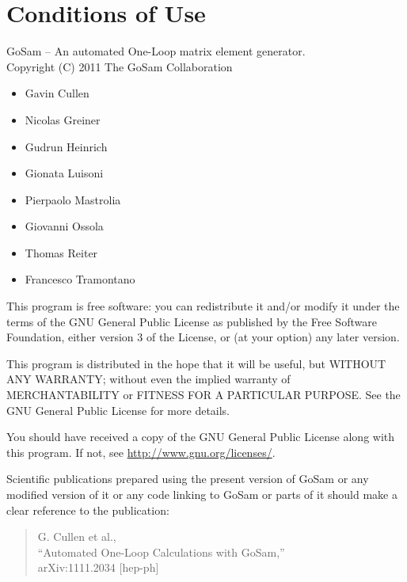 \documentclass[11pt,a4paper]{refrep}
\begin{document}
\begin{fullpage}

%
\end{fullpage}

\chapter*{Conditions of Use}
    GoSam -- An automated One-Loop matrix element generator.\\
    Copyright (C) 2011  The GoSam Collaboration\\
    \begin{itemize}               
                \item Gavin Cullen
                \item Nicolas Greiner
                \item Gudrun Heinrich
                \item Gionata Luisoni
                \item Pierpaolo Mastrolia
                \item Giovanni Ossola
                \item Thomas Reiter
                \item Francesco Tramontano
    \end{itemize}

    This program is free software: you can redistribute it and/or modify
    it under the terms of the GNU General Public License as published by
    the Free Software Foundation, either version 3 of the License, or
    (at your option) any later version.

    This program is distributed in the hope that it will be useful,
    but WITHOUT ANY WARRANTY; without even the implied warranty of
    MERCHANTABILITY or FITNESS FOR A PARTICULAR PURPOSE.  See the
    GNU General Public License for more details.

    You should have received a copy of the GNU General Public License
    along with this program.  If not, see \url{http://www.gnu.org/licenses/}.

    Scientific publications prepared using the present version of
    GoSam or any modified version of it or any code linking to
    GoSam or parts of it should make a clear reference to the publication:

    \begin{quote}
        G. Cullen et al.,\\
        ``Automated One-Loop Calculations with GoSam,''\\
        arXiv:1111.2034 [hep-ph]\\
    \end{quote}
\end{document}

